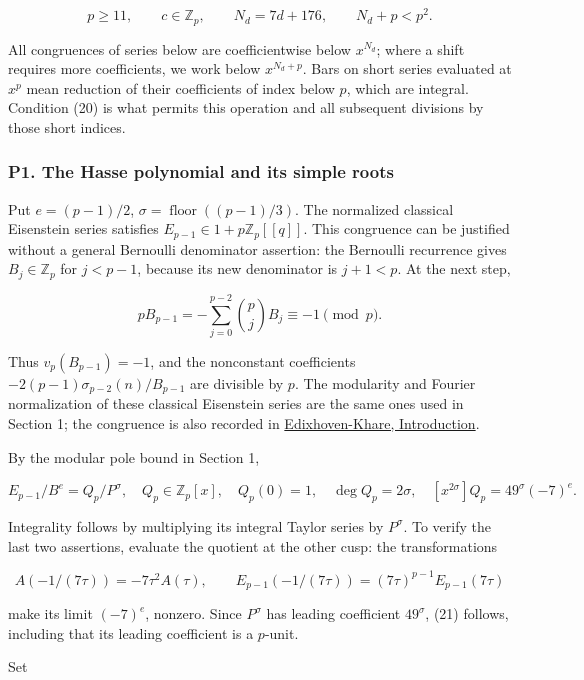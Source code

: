 \documentclass[11pt,a4paper]{article}
\begin{document}
\[
p\ge11,\qquad c\in\mathbb Z_p,\qquad
N_d=7d+176,\qquad N_d+p<p^2.\tag{20}
\]

All congruences of series below are coefficientwise below \(x^{N_d}\); where a shift requires more coefficients, we work below \(x^{N_d+p}\). Bars on short series evaluated at \(x^p\) mean reduction of their coefficients of index below \(p\), which are integral. Condition (20) is what permits this operation and all subsequent divisions by those short indices.

\hypertarget{p1.-the-hasse-polynomial-and-its-simple-roots}{%
\subsubsection{P1. The Hasse polynomial and its simple roots}\label{p1.-the-hasse-polynomial-and-its-simple-roots}}

Put \(e=(p-1)/2\), \(σ=\operatorname{floor}((p-1)/3)\). The normalized classical Eisenstein series satisfies \(E_{p-1}∈1+p\mathbb{Z}_p[[q]]\). This congruence can be justified without a general Bernoulli denominator assertion: the Bernoulli recurrence gives \(B_j∈\mathbb{Z}_p\) for \(j<p-1\), because its new denominator is \(j+1<p\). At the next step,

\[
pB_{p-1}=-\sum_{j=0}^{p-2}\binom pj B_j\equiv-1\pmod p.
\]

Thus \(v_p(B_{p-1})=-1\), and the nonconstant coefficients \(-2(p-1)σ_{p-2}(n)/B_{p-1}\) are divisible by \(p\). The modularity and Fourier normalization of these classical Eisenstein series are the same ones used in Section 1; the congruence is also recorded in \href{https://arxiv.org/pdf/math/0210401}{Edixhoven-Khare, Introduction}.

By the modular pole bound in Section 1,

\[
E_{p-1}/B^e=Q_p/P^\sigma,
\quad Q_p\in\mathbb Z_p[x],\quad Q_p(0)=1,\quad
\deg Q_p=2\sigma,\quad
[x^{2\sigma}]Q_p=49^\sigma(-7)^e.\tag{21}
\]

Integrality follows by multiplying its integral Taylor series by \(P^σ\). To verify the last two assertions, evaluate the quotient at the other cusp: the transformations

\[
A(-1/(7\tau))=-7\tau^2A(\tau),\qquad
E_{p-1}(-1/(7\tau))=(7\tau)^{p-1}E_{p-1}(7\tau)
\]

make its limit \((-7)^e\), nonzero. Since \(P^σ\) has leading coefficient \(49^σ\), (21) follows, including that its leading coefficient is a \(p\)-unit.

Set
\end{document}
